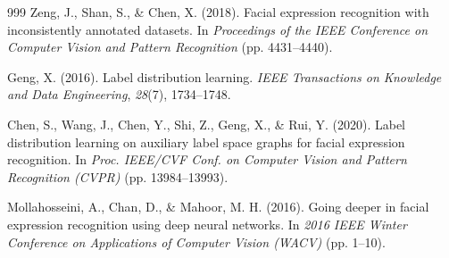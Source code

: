 \documentclass[algorithms,article,submit,moreauthors]{Definitions/mdpi}
\begin{document}
{\begin{thebibliography}{999}
Zeng, J., Shan, S., \& Chen, X. (2018). Facial expression recognition with inconsistently annotated datasets. In \textit{Proceedings of the IEEE Conference on Computer Vision and Pattern Recognition} (pp. 4431--4440).

Geng, X. (2016). Label distribution learning. \textit{IEEE Transactions on Knowledge and Data Engineering}, \textit{28}(7), 1734--1748.

Chen, S., Wang, J., Chen, Y., Shi, Z., Geng, X., \& Rui, Y. (2020). Label distribution learning on auxiliary label space graphs for facial expression recognition. In \textit{Proc. IEEE/CVF Conf. on Computer Vision and Pattern Recognition (CVPR)} (pp. 13984--13993).

Mollahosseini, A., Chan, D., \& Mahoor, M. H. (2016). Going deeper in facial expression recognition using deep neural networks. In \textit{2016 IEEE Winter Conference on Applications of Computer Vision (WACV)} (pp. 1--10).

\end{thebibliography}
}

\end{document}
